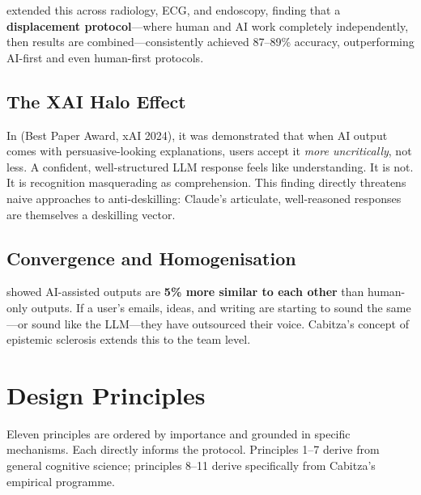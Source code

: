 \documentclass[11pt,a4paper]{article}
\begin{document}
\citet{cabitza2025five} extended this across radiology, ECG, and endoscopy,
finding that a \textbf{displacement protocol}---where human and AI work
completely independently, then results are combined---consistently achieved
87--89\% accuracy, outperforming AI-first and even human-first protocols.

\subsection{The XAI Halo Effect}

In \citet{cabitza2024explanations} (Best Paper Award, xAI 2024), it was
demonstrated that when AI output comes with persuasive-looking explanations,
users accept it \emph{more uncritically}, not less. A confident, well-structured
LLM response feels like understanding. It is not. It is recognition masquerading
as comprehension. This finding directly threatens naive approaches to
anti-deskilling: Claude's articulate, well-reasoned responses are themselves a
deskilling vector.

\subsection{Convergence and Homogenisation}

\citet{doshi2024creativity} showed AI-assisted outputs are \textbf{5\% more
similar to each other} than human-only outputs. If a user's emails, ideas, and
writing are starting to sound the same---or sound like the LLM---they have
outsourced their voice. Cabitza's concept of epistemic sclerosis extends this to
the team level.

\section{Design Principles}
\label{sec:principles}

Eleven principles are ordered by importance and grounded in specific mechanisms.
Each directly informs the protocol. Principles 1--7 derive from general cognitive
science; principles 8--11 derive specifically from Cabitza's empirical programme.
\end{document}
